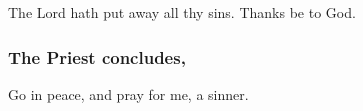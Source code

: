 \smallskip
The Lord hath put away all thy sins. \R Thanks be to God.

\subsubsection{The Priest concludes,}

Go in peace, and pray for me, a sinner.

\fleuron













